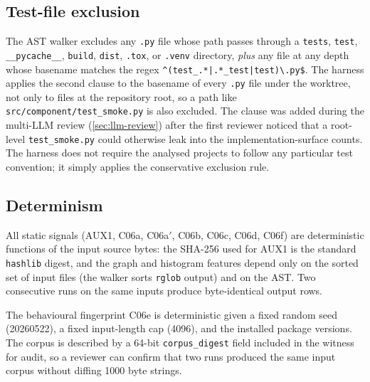 \documentclass[11pt,letterpaper]{article}
\begin{document}
\subsection{Test-file exclusion}
\label{sec:test-exclusion}
The AST walker excludes any \texttt{.py} file whose path passes
through a \texttt{tests}, \texttt{test}, \texttt{\_\_pycache\_\_},
\texttt{build}, \texttt{dist}, \texttt{.tox}, or \texttt{.venv}
directory, \emph{plus} any file at any depth whose basename matches
the regex \texttt{\^{}(test\_.*|.*\_test|test)\textbackslash{}.py\$}.
The harness applies the second clause to the basename of every
\texttt{.py} file under the worktree, not only to files at the
repository root, so a path like
\texttt{src/component/test\_smoke.py} is also excluded. The clause
was added during the multi-LLM review (\cref{sec:llm-review}) after
the first reviewer noticed that a root-level \texttt{test\_smoke.py}
could otherwise leak into the implementation-surface counts. The
harness does not require the analysed projects to follow any
particular test convention; it simply applies the conservative
exclusion rule.

\subsection{Determinism}
\label{sec:determinism}
All static signals (AUX1, C06a, C06a$'$, C06b, C06c, C06d, C06f) are
deterministic functions of the input source bytes: the SHA-256 used for AUX1 is
the standard \texttt{hashlib} digest, and the graph and histogram
features depend only on the sorted set of input files (the walker
sorts \texttt{rglob} output) and on the AST. Two consecutive runs on
the same inputs produce byte-identical output rows.

The behavioural fingerprint C06e is deterministic given a fixed
random seed (20260522), a fixed input-length cap (4096), and the
installed package versions. The corpus is described by a 64-bit
\texttt{corpus\_digest} field included in the witness for audit, so a
reviewer can confirm that two runs produced the same input corpus
without diffing 1000 byte strings.
\end{document}
